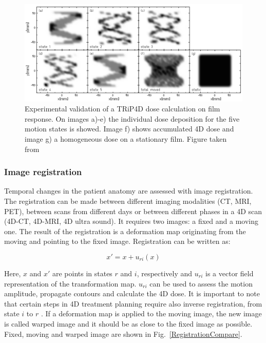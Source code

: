 \newpage
\begin{figure}[H]
\begin{center}
\includegraphics[scale=0.35]{./Fundamentals/Images/4DtreatmentPlanning.png}
\caption{Experimental validation of a TRiP4D dose calculation on film response. On images a)-e) the individual dose deposition for the five motion states is showed.
Image f) shows accumulated 4D dose and image g) a homogeneous dose on a stationary film. Figure taken from \cite{Richter2012}}
\label{TRiP4Ddose}
\end{center}
\end{figure}

\subsubsection{Image registration}
\label{sec:registration}


Temporal changes in the patient anatomy are assessed with image registration. The registration can be made between different imaging modalities (CT, MRI, PET), between scans from different days or between
different phases in a 4D scan (4D-CT, 4D-MRI, 4D ultra sound). It requires two images: a fixed and a moving one. The result of the registration is a deformation map originating from the moving and pointing to the fixed image. Registration can be written as:


\begin{equation}
\label{df}
x' = x + u_{ri}(x)
\end{equation} 

Here, $x$ and $x'$ are points in states $r$ and $i$, respectively and $u_{ri}$ is a vector field representation of the transformation map. $u_{ri}$ can be used to assess the motion amplitude, propagate contours and calculate the 4D dose.
It is important to note that certain steps in 4D treatment planning require also inverse registration, from state $i$ to $r$ \cite{Richter2012}. If a deformation map is applied to the moving image, 
the new image is called warped image and it should be as close to the fixed image as possible. Fixed, moving and warped image are shown in Fig.~\ref{RegistrationCompare}. 

